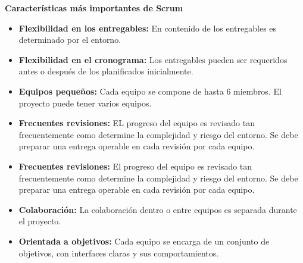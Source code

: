 \documentclass[11pt,openany]{book}
\begin{document}
	\textbf{Características más importantes de Scrum}\\[0.25cm]
	\begin{itemize}
		\item \textbf{Flexibilidad en los entregables: }En contenido de los entregables es determinado por el entorno.
		\item \textbf{Flexibilidad en el cronograma: }Los entregables pueden ser requeridos antes o después de los planificados inicialmente.
		\item \textbf{Equipos pequeños: }Cada equipo se compone de hasta 6 miembros. El proyecto puede tener varios equipos.
		\item \textbf{Frecuentes revisiones: } EL progreso del equipo es revisado tan frecuentemente como determine la complejidad y riesgo del entorno. Se debe preparar una entrega operable en cada revisión por cada equipo.
		\item \textbf{Frecuentes revisiones: }El progreso del equipo es revisado tan frecuentemente como determine la complejidad y riesgo del entorno. Se debe preparar una entrega operable en cada revisión por cada equipo.
		\item \textbf{Colaboración: }La colaboración dentro o entre equipos es separada durante el proyecto.
		\item \textbf{Orientada a objetivos: }Cada equipo se encarga de un conjunto de objetivos, con interfaces claras y sus comportamientos.
	\end{itemize}
\end{document}
